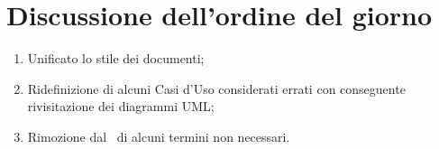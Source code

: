 \documentclass[../verbale-2017-01-05.tex]{subfiles}
\begin{document}
	\section{Discussione dell'ordine del giorno}
	\begin{enumerate}
		\item Unificato lo stile dei documenti;
		\item Ridefinizione di alcuni Casi d'Uso considerati errati con conseguente rivisitazione dei diagrammi UML;
		\item Rimozione dal \glossario\ di alcuni termini non necessari.
	\end{enumerate}
\end{document}
